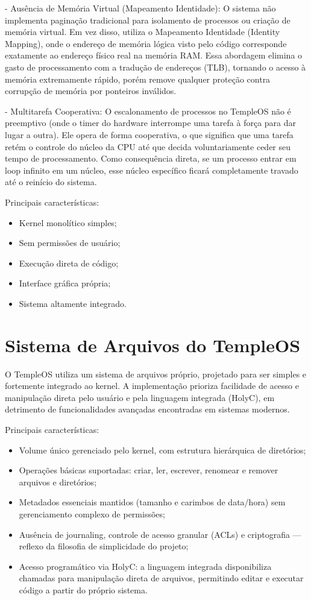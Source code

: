 \documentclass[12pt,oneside,a4paper,chapter=TITLE]{abntex2}
\begin{document}
 - Ausência de Memória Virtual (Mapeamento Identidade): O sistema não implementa paginação tradicional para isolamento de processos ou criação de memória virtual. Em vez disso, utiliza o Mapeamento Identidade (Identity Mapping), onde o endereço de memória lógica visto pelo código corresponde exatamente ao endereço físico real na memória RAM. Essa abordagem elimina o gasto de processamento com a tradução de endereços (TLB), tornando o acesso à memória extremamente rápido, porém remove qualquer proteção contra corrupção de memória por ponteiros inválidos.

 - Multitarefa Cooperativa: O escalonamento de processos no TempleOS não é preemptivo (onde o timer do hardware interrompe uma tarefa à força para dar lugar a outra). Ele opera de forma cooperativa, o que significa que uma tarefa retém o controle do núcleo da CPU até que decida voluntariamente ceder seu tempo de processamento. Como consequência direta, se um processo entrar em loop infinito em um núcleo, esse núcleo específico ficará completamente travado até o reinício do sistema.

Principais características:
\begin{itemize}
    \item Kernel monolítico simples;
    \item Sem permissões de usuário;
    \item Execução direta de código;
    \item Interface gráfica própria;
    \item Sistema altamente integrado.
\end{itemize}

\section{Sistema de Arquivos do TempleOS}

O TempleOS utiliza um sistema de arquivos próprio, projetado para ser simples e fortemente integrado ao kernel. A implementação prioriza facilidade de acesso e manipulação direta pelo usuário e pela linguagem integrada (HolyC), em detrimento de funcionalidades avançadas encontradas em sistemas modernos.

Principais características:
\begin{itemize}
    \item Volume único gerenciado pelo kernel, com estrutura hierárquica de diretórios;
    \item Operações básicas suportadas: criar, ler, escrever, renomear e remover arquivos e diretórios;
    \item Metadados essenciais mantidos (tamanho e carimbos de data/hora) sem gerenciamento complexo de permissões;
    \item Ausência de journaling, controle de acesso granular (ACLs) e criptografia — reflexo da filosofia de simplicidade do projeto;
    \item Acesso programático via HolyC: a linguagem integrada disponibiliza chamadas para manipulação direta de arquivos, permitindo editar e executar código a partir do próprio sistema.
\end{itemize}
\end{document}

